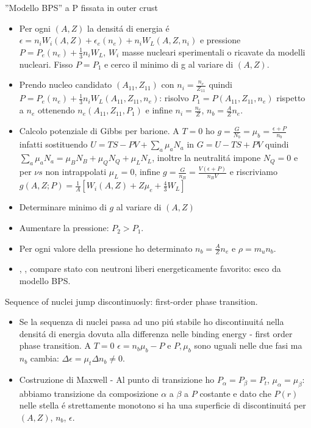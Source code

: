 \begin{frame}{''Modello BPS'' a P fissata in outer crust}
    \begin{itemize}
        \item Per ogni $(A,Z)$ la densit\'a di energia \'e $\epsilon=n_iW_i(A,Z)+\epsilon_e(n_e)+n_iW_L(A,Z,n_i)$ e pressione $P=P_e(n_e)+\frac{1}{3}n_iW_L$, $W_i$ masse nucleari sperimentali o ricavate da modelli nucleari. Fisso $P=P_1$ e cerco il minimo di g al variare di $(A,Z)$.
        \item Prendo nucleo candidato $(A_{11},Z_{11})$ con $n_i=\frac{n_e}{Z_{11}}$ quindi $P=P_e(n_e)+\frac{1}{3}n_iW_L(A_{11},Z_{11},n_e)$: risolvo $P_1=P(A_{11},Z_{11},n_e)$ rispetto a $n_e$ ottenendo $n_e(A_{11},Z_{11},P_1)$ e infine $n_i=\frac{n_e}{Z}$, $n_b=\frac{A}{Z}n_e$.
        \item Calcolo potenziale di Gibbs per barione. A $T=0$ ho $g=\frac{G}{N_b}=\mu_b=\frac{\epsilon+P}{n_b}$ infatti sostituendo $U=TS-PV+\sum_a\mu_aN_a$ in $G=U-TS+PV$ quindi $\sum_a\mu_aN_a=\mu_BN_B+\mu_QN_Q+\mu_LN_L$, inoltre la neutralit\'a impone $N_Q=0$ e per $\nu s$ non intrappolati $\mu_L=0$, infine $g=\frac{G}{n_B}=\frac{V(\epsilon+P)}{n_BV}$ e riscriviamo $g(A,Z;P)=\frac{1}{A}[W_i(A,Z)+Z\mu_e+\frac{4}{3}W_L]$
        \item Determinare minimo di $g$ al variare di $(A,Z)$
        \item Aumentare la pressione: $P_2>P_1$.
        \item Per ogni valore della pressione ho determinato $n_b=\frac{A}{Z}n_e$ e $\rho=m_un_b$.
        \item {}, , compare stato con neutroni liberi energeticamente favorito: esco da modello BPS.
    \end{itemize}
\end{frame}

\begin{frame}{Sequence of nuclei jump discontinuosly: first-order phase transition.}
    \begin{itemize}
        \item Se la sequenza di nuclei passa ad uno pi\'u stabile ho discontinuit\'a nella densit\'a di energia dovuta alla differenza nelle binding energy - first order phase transition. A $T=0$ $\epsilon=n_b\mu_b-P$ e $P, \mu_b$ sono uguali nelle due fasi ma $n_b$ cambia: $\Delta\epsilon=\mu_t\Delta n_b\neq0$.
        \item Costruzione di Maxwell - Al punto di transizione ho $P_{\alpha}=P_{\beta}=P_t$, $\mu_{\alpha}=\mu_{\beta}$: abbiamo transizione da composizione $\alpha$ a $\beta$ a $P$ costante e dato che $P(r)$ nelle stella \'e strettamente monotono si ha una superficie di discontinuit\'a per $(A,Z)$, $n_b$, $\epsilon$.
    \end{itemize}
\end{frame}

